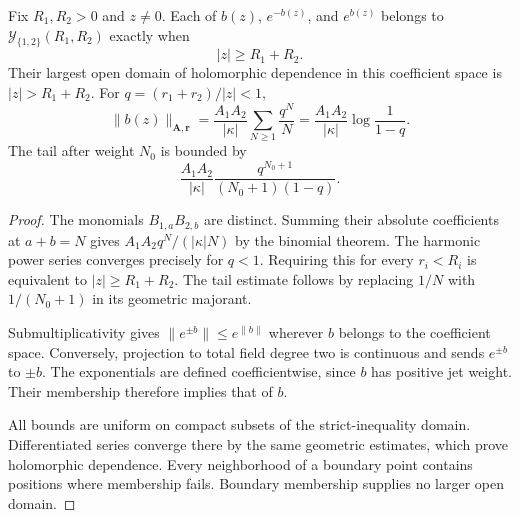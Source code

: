 \begin{theorem}\label{cbc:ac:exact-domain}
Fix $R_1,R_2>0$ and $z\ne0$. Each of
$b(z)$, $e^{-b(z)}$, and $e^{b(z)}$ belongs to
$\mathcal Y_{\{1,2\}}(R_1,R_2)$ exactly when
\[
 |z|\geq R_1+R_2.
\]
Their largest open domain of holomorphic dependence in
this coefficient space is $|z|>R_1+R_2$.
For $q=(r_1+r_2)/|z|<1$,
\begin{equation}\label{cbc:ac:exact-norm}
 \|b(z)\|_{\mathbf A,\mathbf r}
   =\frac{A_1A_2}{|\kappa|}
                      \sum_{N\geq1}\frac{q^N}{N}
   =\frac{A_1A_2}{|\kappa|}\log\frac1{1-q}.
\end{equation}
The tail after weight $N_0$ is bounded by
\[
 \frac{A_1A_2}{|\kappa|}
       \frac{q^{N_0+1}}{(N_0+1)(1-q)}.
\]
\end{theorem}
\begin{proof}
The monomials $B_{1,a}B_{2,b}$ are distinct. Summing
their absolute coefficients at $a+b=N$ gives
$A_1A_2q^N/(|\kappa|N)$ by the binomial theorem.
The harmonic power series converges precisely for $q<1$.
Requiring this for every $r_i<R_i$ is equivalent to
$|z|\geq R_1+R_2$. The tail estimate follows by replacing
$1/N$ with $1/(N_0+1)$ in its geometric majorant.

Submultiplicativity gives
$\|e^{\pm b}\|\leq e^{\|b\|}$ wherever $b$ belongs to
the coefficient space. Conversely, projection to total
field degree two is continuous and sends $e^{\pm b}$ to
$\pm b$. The exponentials are defined coefficientwise,
since $b$ has positive jet weight. Their membership
therefore implies that of $b$.

All bounds are uniform on compact subsets of the
strict-inequality domain. Differentiated series converge
there by the same geometric estimates, which prove
holomorphic dependence. Every neighborhood of a boundary
point contains positions where membership fails.
Boundary membership supplies no larger open domain.
\end{proof}

